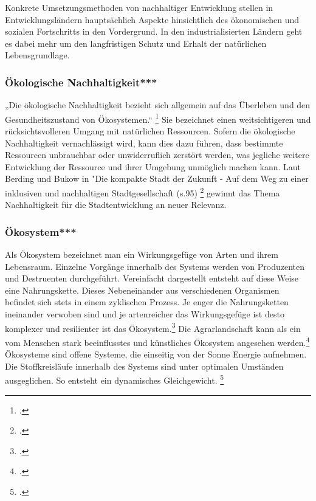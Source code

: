\documentclass{scrartcl}
\begin{document}
 Konkrete Umsetzungsmethoden von nachhaltiger Entwicklung stellen in Entwicklungsländern hauptsächlich Aspekte hinsichtlich des ökonomischen und sozialen Fortschritts in den Vordergrund. In den industrialisierten Ländern geht es dabei mehr um den langfristigen Schutz und Erhalt der natürlichen Lebensgrundlage. 



\subsubsection{Ökologische Nachhaltigkeit***}
„Die ökologische Nachhaltigkeit bezieht sich allgemein auf das Überleben und den Gesundheitszustand von Ökosystemen.“ \footcite{DefinitionWirtschaftslexikonc}  Sie bezeichnet einen weitsichtigeren und rücksichtsvolleren Umgang mit natürlichen Ressourcen. Sofern die ökologische Nachhaltigkeit vernachlässigt wird, kann dies dazu führen, dass bestimmte Ressourcen unbrauchbar oder unwiderruflich zerstört werden, was jegliche weitere Entwicklung der Ressource und ihrer Umgebung unmöglich machen kann. Laut Berding und Bukow in "Die kompakte Stadt der Zukunft - Auf dem Weg zu einer inklusiven und nachhaltigen Stadtgesellschaft (s.95) \footcite{BerdingWolf-DietrichBukowKarinCudakHrsgDieStadtgesellschaft} gewinnt das Thema Nachhaltigkeit für die Stadtentwicklung an neuer Relevanz. 



\subsubsection{Ökosystem***}
Als Ökosystem bezeichnet man ein Wirkungsgefüge von Arten und ihrem Lebensraum. Einzelne Vorgänge innerhalb des Systems werden von Produzenten und Destruenten durchgeführt. Vereinfacht dargestellt entsteht auf diese Weise eine Nahrungskette. Dieses Nebeneinander aus verschiedenen Organismen befindet sich stets in einem zyklischen Prozess. Je enger die Nahrungsketten ineinander verwoben sind und je artenreicher das Wirkungsgefüge ist desto komplexer und resilienter ist das Ökosystem.\footcite{NachhaltigeBrockhaus.de} Die Agrarlandschaft kann als ein vom Menschen stark beeinflusstes und künstliches Ökosystem angesehen werden.\footcite[Vgl.]{BrockhausOkosystem}
Ökosysteme sind offene Systeme, die einseitig von der Sonne Energie aufnehmen. Die Stoffkreisläufe innerhalb des Systems sind unter optimalen Umständen ausgeglichen. So entsteht ein dynamisches Gleichgewicht. \footcite{BrockhausOkosystem}
\end{document}
